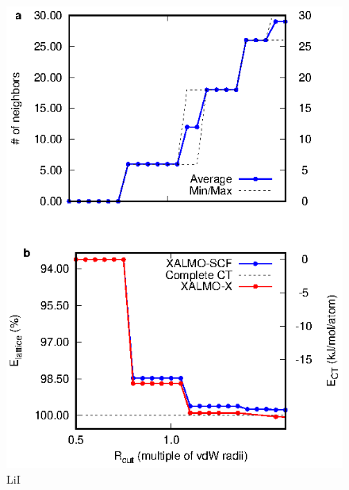 \documentclass[aps,prb,twocolumn,amsmath,amssymb,superscriptaddress,longbibliography]{revtex4-1}
\begin{document}
\begin{figure}
\includegraphics[scale=1]{./plots/LiI_EvR}
\caption{LiI}
\label{lii}
\end{figure}
\end{document}
